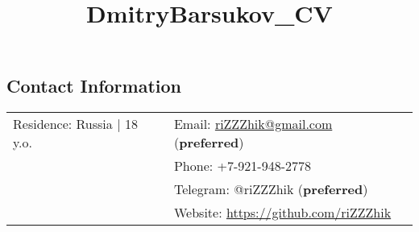 \documentclass[margin,line]{res}
\begin{document}
\title{DmitryBarsukov_CV}

\begin{resume}

\section{\sc Contact Information}

\vspace{.05in}
\begin{tabular}{@{}p{2.30in}p{3in}}
Residence: Russia {|} 18 y.o.
& Email: \href{mailto:riZZZhik@gmail.com}{riZZZhik@gmail.com} (\textbf{preferred}) \\
& Phone: +7-921-948-2778 \\
& Telegram: @riZZZhik (\textbf{preferred}) \\
& Website: \href{https://github.com/riZZZhik}{https://github.com/riZZZhik} \\
\end{tabular}





\end{resume}
\end{document}
